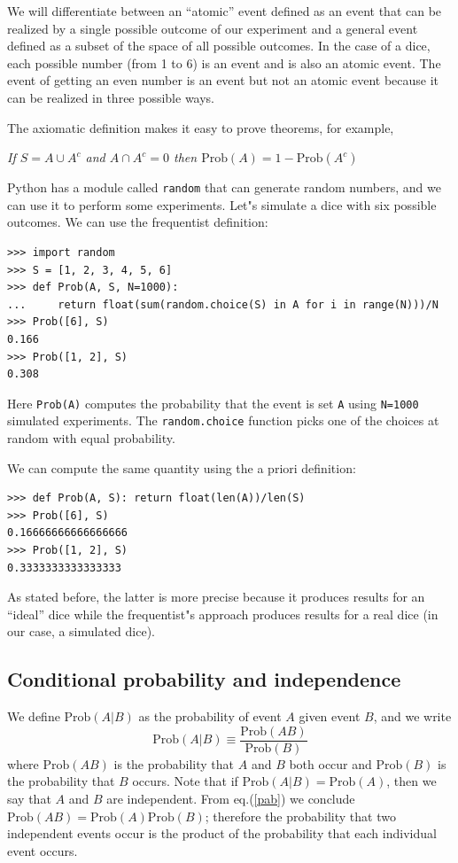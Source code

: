 \documentclass[justified, sixbynine]{tufte-book}
\def\ft{\small\tt}
\theoremstyle{plain}%
\newtheorem * {corollary}{Corollary}
\theoremstyle{definition}
\theoremstyle{remark}
\newtheorem * {remark}{Remark}
\newtheorem * {note}{Note}
\begin{document}
\begin{fullwidth}
We will differentiate between an ``atomic'' event defined as an event that
can be realized by a single possible outcome of our experiment and a general
event defined as a subset of the space of all possible outcomes. In the case
of a dice, each possible number (from 1 to 6) is an event and is also an
atomic event. The event of getting an even number is an event but not an
atomic event because it can be realized in three possible ways.

The axiomatic definition makes it easy to prove theorems, for example, 

{\it If $S=A\cup A^c$ and $A\cap A^c=0$ then $\textrm{Prob}(A)=1-\textrm{Prob}(A^c)$}

Python has a module called {\ft random} that can generate random numbers, and we can use it to perform some experiments.
Let"s simulate a dice with six possible outcomes.
We can use the frequentist definition:

\begin{lstlisting}[caption={in file: {\ft nlib.py}}]
>>> import random
>>> S = [1, 2, 3, 4, 5, 6]
>>> def Prob(A, S, N=1000):
...     return float(sum(random.choice(S) in A for i in range(N)))/N
>>> Prob([6], S)
0.166
>>> Prob([1, 2], S)
0.308
\end{lstlisting}
Here {\ft \textrm{Prob}(A)} computes the probability that the event is set {\ft A} using {\ft N=1000} simulated experiments.
The {\ft random.choice} function picks one of the choices at random with equal probability.

We can compute the same quantity using the a priori definition:

\begin{lstlisting}[caption={in file: {\ft nlib.py}}]
>>> def Prob(A, S): return float(len(A))/len(S)
>>> Prob([6], S)
0.16666666666666666
>>> Prob([1, 2], S)
0.3333333333333333
\end{lstlisting}

As stated before, the latter is more precise because it produces results for an ``ideal'' dice while the frequentist"s approach produces results for a real dice (in our case, a simulated dice).

\goodbreak\subsection{Conditional probability and independence}

We define $\textrm{Prob}(A|B)$ as the probability of event $A$ given event $B$, and we
write
\begin{equation}
\textrm{Prob}(A|B)\equiv \frac{\textrm{Prob}(AB)}{\textrm{Prob}(B)}  \label{pab}
\end{equation}
where $\textrm{Prob}(AB)$ is the probability that $A$ and $B$ both occur and $\textrm{Prob}(B)$ is
the probability that $B$ occurs. Note that if $\textrm{Prob}(A|B)=\textrm{Prob}(A)$, then we say
that $A$ and $B$ are independent. From eq.(\ref{pab})
we conclude $\textrm{Prob}(AB)=\textrm{Prob}(A)\textrm{Prob}(B)$; therefore the probability that two
independent events occur is the product of the probability that each individual event
occurs.


\end{fullwidth}
\end{document}
